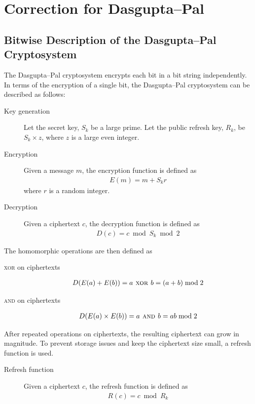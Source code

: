 \section{Correction for Dasgupta--Pal}
\label{chap:correction}
\subsection{Bitwise Description of the Dasgupta--Pal Cryptosystem}
The Dasgupta--Pal cryptosystem \cite{dasgupta_design_2016} encrypts each bit in a bit string independently.
In terms of the encryption of a single bit, the Dasgupta--Pal cryptosystem can be described as follows:
\begin{description}
	\item[Key generation]
	Let the secret key, $S_k$ be a large prime.
	Let the public refresh key, $R_k$, be $S_k \times z$, where $z$ is a large even integer.
	\item[Encryption]
	Given a message $m$, the encryption function is defined as
	\begin{align*}
		E(m) = m + S_kr
	\end{align*}
	where $r$ is a random integer.
	\item[Decryption]
	Given a ciphertext $c$, the decryption function is defined as
	\begin{align*}
		D(c) = c \bmod S_k \bmod 2
	\end{align*}
\end{description}
The homomorphic operations are then defined as
\begin{description}
	\item[\textsc{xor} on ciphertexts]
	\begin{align*}
		D(E(a)+E(b)) = a \textsc{ xor } b = (a + b) \bmod 2
	\end{align*}
	\item[\textsc{and} on ciphertexts]
	\begin{align*}
		D(E(a)\times E(b)) = a \textsc{ and } b = ab \bmod 2
	\end{align*}
\end{description}
After repeated operations on ciphertexts, the resulting ciphertext can grow in magnitude.
To prevent storage issues and keep the ciphertext size small, a refresh function is used.
\begin{description}
	\item[Refresh function]
	Given a ciphertext $c$, the refresh function is defined as
	\begin{align*}
		R(c) = c \bmod R_k
	\end{align*}
\end{description}

